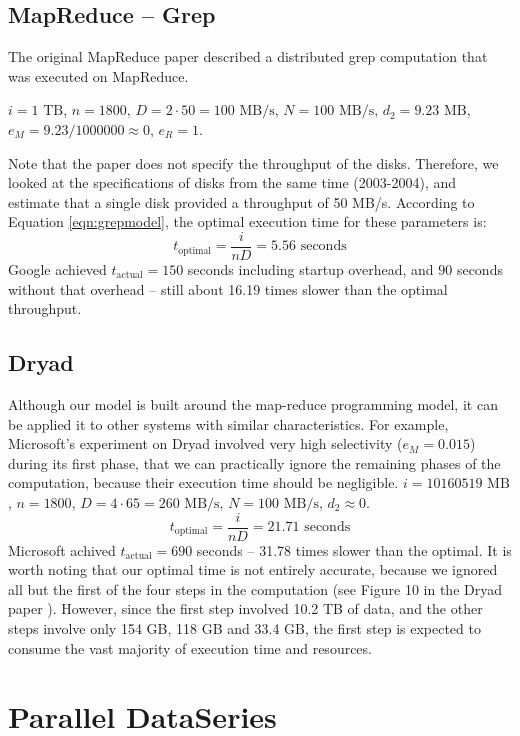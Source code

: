 \documentclass{acm_proc_article-sp}
\begin{document}
\subsection{MapReduce -- Grep}

The original MapReduce paper \cite{mapreduce} described a distributed grep computation that was executed on MapReduce.

$i = 1 \text{ TB}$, $n = 1800$, $D = 2 \cdot 50 = 100 \text{ MB/s}$, $N = 100 \text{ MB/s}$, $d_2 = 9.23 \text{ MB}$, $e_M = 9.23/1000000 \approx 0$, $e_R = 1$.

Note that the paper does not specify the throughput of the disks. Therefore, we looked at the specifications of disks from the same time (2003-2004), and estimate that a single disk provided a throughput of 50 MB/s. According to Equation \ref{eqn:grepmodel}, the optimal execution time for these parameters is:
\[t_\text{optimal} = \frac{i}{n D} = 5.56 \text{ seconds}\]
Google achieved $t_\text{actual} = 150$ seconds including startup overhead, and $90$ seconds without that overhead -- still about 16.19 times slower than the optimal throughput.

\subsection{Dryad}

Although our model is built around the map-reduce programming model, it can be applied it to other systems with similar characteristics. For example, Microsoft's experiment on Dryad \cite{dryad} involved very high selectivity ($e_M = 0.015$) during its first phase, that we can practically ignore the remaining phases of the computation, because their execution time should be negligible. 
$i = 10160519 \text{ MB}$, $n = 1800$, $D = 4 \cdot 65 = 260 \text{ MB/s}$, $N = 100 \text{ MB/s}$, $d_2 \approx 0$.
\[t_\text{optimal} = \frac{i}{n D} = 21.71 \text{ seconds}\]
Microsoft achived $t_\text{actual} = 690$ seconds -- 31.78 times slower than the optimal. It is worth noting that our optimal time is not entirely accurate, because we ignored all but the first of the four steps in the computation (see Figure 10 in the Dryad paper \cite{dryad}). However, since the first step involved 10.2 TB of data, and the other steps involve only 154 GB, 118 GB and 33.4 GB, the first step is expected to consume the vast majority of execution time and resources.

\section{Parallel DataSeries}
\end{document}
